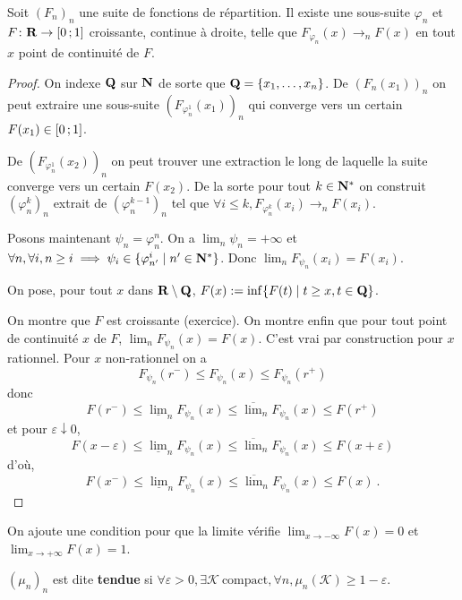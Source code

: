 	\begin{lem}[d'Helly]
		Soit $(F_n)_n$ une suite de fonctions de répartition.
		Il existe une sous-suite $\varphi_n$ et $F \colon \mathbf{R} \to \mathopen{}\mathclose{\left[0\mathclose{}\mathpunct{};1\right]}$ croissante, continue à droite, telle que $F_{\varphi_n}(x) \longrightarrow_n F(x)$ en tout $x$ point de continuité de $F$.
	\end{lem}

	\begin{proof}
		On indexe $\mathbf{Q}$ sur $\mathbf{N}$ de sorte que $\mathbf{Q} = \{ x_1, \ldots, x_n \}$.
		De $(F_n(x_1))_n$ on peut extraire une sous-suite $(F_{\varphi_n^1}(x_1))_n$ qui converge vers un certain $F(x_1) \in \mathopen{}\mathclose{\left[0\mathclose{}\mathpunct{};1\right]}$.
		
		De $(F_{\varphi_n^1}(x_2))_n$ on peut trouver une extraction le long de laquelle la suite converge vers un certain $F(x_2)$.
		De la sorte pour tout $k \in \mathbf{N}^*$ on construit $(\varphi_n^k)_n$ extrait de $(\varphi_n^{k - 1})_n$ tel que $\forall i \leq k, F_{\varphi_n^k}(x_i) \longrightarrow_n F(x_i)$.
		
		Posons maintenant $\psi_n = \varphi_n^n$.
		On a $\lim_n \psi_n = +\infty$ et $\forall n, \forall i, n \geq i \implies \psi_i \in \{ \varphi_{n'}^i \mid n' \in \mathbf{N}^* \}$.
		Donc $\lim_n F_{\psi_n}(x_i) = F(x_i)$.
		
		On pose, pour tout $x$ dans $\mathbf{R} \setminus \mathbf{Q}$, $F(x) := \inf \{ F(t) \mid t \geq x, t \in \mathbf{Q} \}$.
		
		On montre que $F$ est croissante (exercice).
		On montre enfin que pour tout point de continuité $x$ de $F$, $\lim_n F_{\psi_n}(x) = F(x)$.
		C'est vrai par construction pour $x$ rationnel.
		Pour $x$ non-rationnel on a
		$$F_{\psi_n}(r^-) \leq F_{\psi_n}(x) \leq F_{\psi_n}(r^+)$$
		donc
		$$F(r^-) \leq \underline{\lim}_n F_{\psi_n}(x) \leq \overline{\lim}_n F_{\psi_n}(x) \leq F(r^+)$$
		et pour $\varepsilon \downarrow 0$,
		$$F(x - \varepsilon) \leq \underline{\lim}_n F_{\psi_n}(x) \leq \overline{\lim}_n F_{\psi_n}(x) \leq F(x + \varepsilon)$$
		d'où,
		$$F(x^-) \leq \underline{\lim}_n F_{\psi_n}(x) \leq \overline{\lim}_n F_{\psi_n}(x) \leq F(x)\ .$$
	\end{proof}
	
	On ajoute une condition pour que la limite vérifie $\lim_{x \to -\infty} F(x) = 0$ et $\lim_{x \to +\infty} F(x) = 1$.

	\begin{defn}
		$(\mu_n)_n$ est dite \textbf{tendue} si $\forall \varepsilon > 0, \exists \mathcal{K} \ \text{compact}, \forall n, \mu_n(\mathcal{K}) \geq 1 - \varepsilon$.
	\end{defn}

